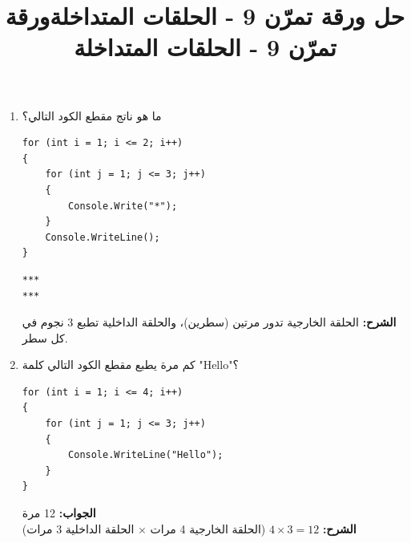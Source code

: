 \documentclass[14pt]{extarticle}
\title{حل ورقة تمرّن 9 - الحلقات المتداخلة}
\title{ورقة تمرّن 9 - الحلقات المتداخلة}
\begin{document}
\maketitle
\thispagestyle{fancy}

\begin{enumerate}[itemsep=2em]

    \item
    ما هو ناتج مقطع الكود التالي؟
    \begin{boxCode}
    \begin{english}
    \begin{verbatim}
for (int i = 1; i <= 2; i++)
{
    for (int j = 1; j <= 3; j++)
    {
        Console.Write("*");
    }
    Console.WriteLine();
}
    \end{verbatim}
    \end{english}
    \end{boxCode}
    \ifwithsols
    \begin{boxSolution}
    \begin{english}
    \begin{boxCode}
\begin{verbatim}
***
***
    \end{verbatim}
\end{boxCode}
    \end{english}
    \textbf{الشرح:} الحلقة الخارجية تدور مرتين (سطرين)، والحلقة الداخلية تطبع 3 نجوم في كل سطر.
    \end{boxSolution}
    \clearpage
    \fi

    \item
    كم مرة يطبع مقطع الكود التالي كلمة \textenglish{"Hello"}؟
    \begin{boxCode}
    \begin{english}
    \begin{verbatim}
for (int i = 1; i <= 4; i++)
{
    for (int j = 1; j <= 3; j++)
    {
        Console.WriteLine("Hello");
    }
}
    \end{verbatim}
    \end{english}
    \end{boxCode}
    \ifwithsols
    \begin{boxSolution}
    \textbf{الجواب:} 12 مرة\\
    \textbf{الشرح:} $4 \times 3 = 12$ (الحلقة الخارجية 4 مرات × الحلقة الداخلية 3 مرات)
    \end{boxSolution}
    \fi


\end{enumerate}
\end{document}
